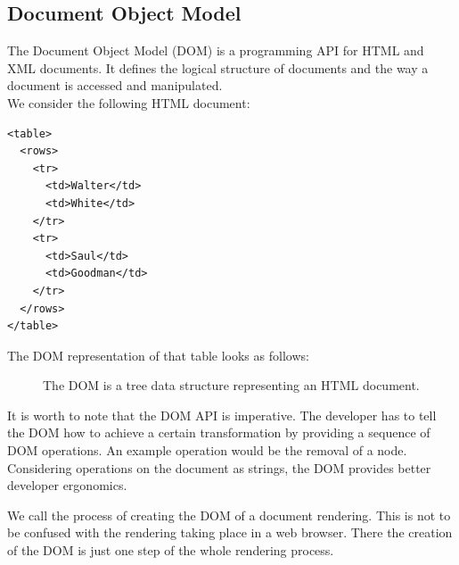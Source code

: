 \subsection{Document Object Model}\label{documentobjectmodel}
The Document Object Model (DOM) is a programming API for HTML and XML documents. It defines the logical structure of documents and the way a document is accessed and manipulated. \citep{domintro} \\ We consider the following HTML document:

\lstset{language=XML}
\begin{lstlisting}[caption=HTML document of a table, label=htmloftable]
<table>
  <rows>
    <tr>
      <td>Walter</td>
      <td>White</td>
    </tr>
    <tr>
      <td>Saul</td>
      <td>Goodman</td>
    </tr>
  </rows>
</table>
\end{lstlisting}

The DOM representation of that table looks as follows:

\begin{figure}[!htb]
  \caption{The DOM is a tree data structure representing an HTML document.}
\end{figure}

It is worth to note that the DOM API is imperative. The developer has to tell the DOM how to achieve a certain transformation by providing a sequence of DOM operations. An example operation would be the removal of a node. Considering operations on the document as strings, the DOM provides better developer ergonomics.

We call the process of creating the DOM of a document rendering. This is not to be confused with the rendering taking place in a web browser. There the creation of the DOM is just one step of the whole rendering process.

